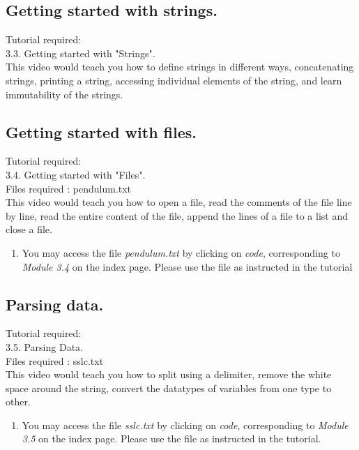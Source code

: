 \documentclass[11pt,twocolumn]{article}
\newenvironment{enumcpt}{\begin{enumerate} \topsep 0pt \partopsep 0pt 
                        \parsep 0pt
                        \itemsep 0pt \leftmargin -1in \rightmargin 0pt
                        }{\end{enumerate}}
\begin{document}
\subsection{Getting started with strings.}
Tutorial required: \\ 3.3. Getting started with "Strings". \\
This video would teach you how to define strings in different ways, concatenating strings, printing a string, accessing individual elements of the string, and learn immutability of the strings. 
\subsection{Getting started with files.}
Tutorial required: \\ 3.4. Getting started with "Files". \\
Files required : pendulum.txt \\
This video would teach you how to open a file, read the comments of the file line by line, read the entire content of the file, append the lines of a file to a list and close a file.
\begin{enumcpt}
\item You may access the file  \emph{pendulum.txt}  by clicking on \emph{code}, corresponding to \emph{Module 3.4} on the index page. Please use the file as instructed in the tutorial
\end{enumcpt}

\subsection{Parsing data.}
Tutorial required: \\ 3.5. Parsing Data. \\
Files required : sslc.txt \\
This video would teach you how to split using a delimiter, remove the white space around the string, convert the datatypes  of variables from one type to other. 
\begin{enumcpt}
\item You may access the file  \emph{sslc.txt} by clicking on \emph{code}, corresponding to \emph{Module 3.5} on the index page. Please use the file as instructed in the tutorial. 
\end{enumcpt}
\end{document}
